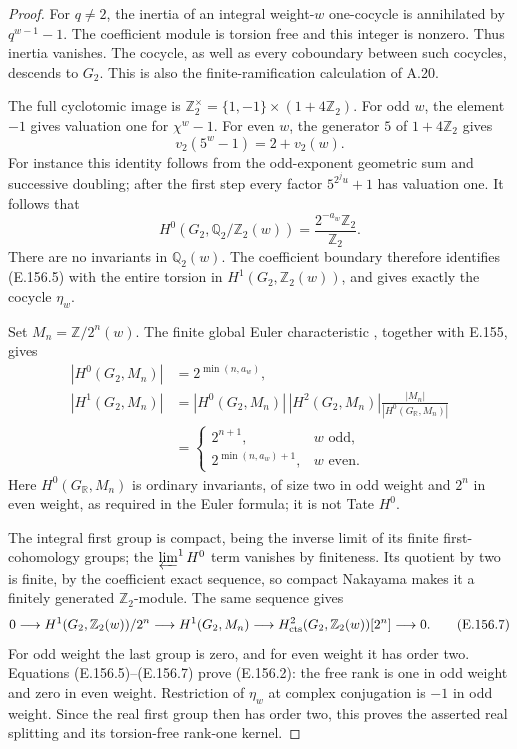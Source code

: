 \begin{proof}
For \(q\ne2\), the inertia of an integral weight-\(w\)
one-cocycle is annihilated by \(q^{w-1}-1\). The coefficient
module is torsion free and this integer is nonzero.
Thus inertia vanishes. The cocycle, as well as every
coboundary between such cocycles, descends to \(G_2\).
This is also the finite-ramification calculation of A.20.

The full cyclotomic image is
\(\mathbb Z_2^\times=\{1,-1\}\times(1+4\mathbb Z_2)\).
For odd \(w\), the element \(-1\) gives valuation one for
\(\chi^w-1\). For even \(w\), the generator \(5\) of
\(1+4\mathbb Z_2\) gives
\[
                 v_2(5^w-1)=2+v_2(w).
 \tag{E.156.4}
\]
For instance this identity follows from the odd-exponent
geometric sum and successive doubling; after the first
step every factor \(5^{2^ju}+1\) has valuation one.
It follows that
\[
 H^0(G_2,\mathbb Q_2/\mathbb Z_2(w))
        =\frac{2^{-a_w}\mathbb Z_2}{\mathbb Z_2}.
 \tag{E.156.5}
\]
There are no invariants in \(\mathbb Q_2(w)\).
The coefficient boundary therefore identifies (E.156.5)
with the entire torsion in \(H^1(G_2,\mathbb Z_2(w))\),
and gives exactly the cocycle \(\eta_w\).

Set \(M_n=\mathbb Z/2^n(w)\).
The finite global Euler characteristic
\citep[I.5.1, p.~67; I.5.2(c), p.~68]{CohMilneADT},
together with E.155, gives
\[
 \begin{split}
 |H^0(G_2,M_n)|&=2^{\min(n,a_w)},\\
 |H^1(G_2,M_n)|
  &=|H^0(G_2,M_n)|\,|H^2(G_2,M_n)|
           \frac{|M_n|}{|H^0(G_{\mathbb R},M_n)|}\\
  &=
  \begin{cases}
   2^{n+1},&w\text{ odd},\\
   2^{\min(n,a_w)+1},&w\text{ even}.
  \end{cases}
 \end{split}
 \tag{E.156.6}
\]
Here \(H^0(G_{\mathbb R},M_n)\) is ordinary invariants,
of size two in odd weight and \(2^n\) in even weight,
as required in the Euler formula; it is not Tate \(H^0\).

The integral first group is compact, being the inverse
limit of its finite first-cohomology groups; the
\(\varprojlim^1H^0\) term vanishes by finiteness.
Its quotient by two is finite, by the coefficient exact
sequence, so compact Nakayama makes it a finitely
generated \(\mathbb Z_2\)-module. The same sequence gives
\[
 0\longrightarrow H^1(G_2,\mathbb Z_2(w))/2^n
 \longrightarrow H^1(G_2,M_n)
 \longrightarrow H^2_{\rm cts}(G_2,\mathbb Z_2(w))[2^n]
 \longrightarrow0.
 \tag{E.156.7}
\]
For odd weight the last group is zero, and for even
weight it has order two. Equations (E.156.5)--(E.156.7)
prove (E.156.2): the free rank is one in odd weight and
zero in even weight. Restriction of \(\eta_w\) at complex
conjugation is \(-1\) in odd weight. Since the real first
group then has order two, this proves the asserted
real splitting and its torsion-free rank-one kernel.


\end{proof}
